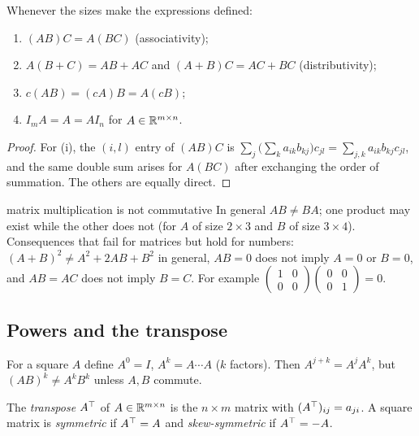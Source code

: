 \begin{theorem}\label{thm:matalg}
Whenever the sizes make the expressions defined:
\begin{enumerate}[label=(\roman*)]
  \item $(AB)C=A(BC)$ (associativity);
  \item $A(B+C)=AB+AC$ and $(A+B)C=AC+BC$ (distributivity);
  \item $c(AB)=(cA)B=A(cB)$;
  \item $I_mA=A=AI_n$ for $A\in\mathbb{R}^{m\times n}$.
\end{enumerate}
\end{theorem}

\begin{proof}
For (i), the $(i,l)$ entry of $(AB)C$ is $\sum_j\big(\sum_k a_{ik}b_{kj}\big)c_{jl}=\sum_{j,k}a_{ik}b_{kj}c_{jl}$, and the same double sum arises for $A(BC)$ after exchanging the order of summation. The others are equally direct.
\end{proof}

\begin{pitfall}{matrix multiplication is not commutative}
In general $AB\ne BA$; one product may exist while the other does not (for $A$ of size $2\times3$ and $B$ of size $3\times 4$). Consequences that fail for matrices but hold for numbers: $(A+B)^2\ne A^2+2AB+B^2$ in general, $AB=0$ does not imply $A=0$ or $B=0$, and $AB=AC$ does not imply $B=C$. For example $\begin{pmatrix}1&0\\0&0\end{pmatrix}\begin{pmatrix}0&0\\0&1\end{pmatrix}=0$.
\end{pitfall}

\subsection*{Powers and the transpose}

For a square $A$ define $A^0=I$, $A^k=A\cdots A$ ($k$ factors). Then $A^{j+k}=A^jA^k$, but $(AB)^k\ne A^kB^k$ unless $A,B$ commute.

\begin{definition}[Transpose]
The \emph{transpose} $A^{\top}$ of $A\in\mathbb{R}^{m\times n}$ is the $n\times m$ matrix with $(A^{\top})_{ij}=a_{ji}$. A square matrix is \emph{symmetric} if $A^{\top}=A$ and \emph{skew-symmetric} if $A^{\top}=-A$.
\end{definition}

